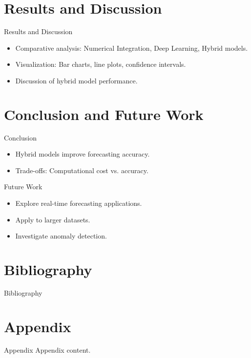 \documentclass[10pt]{beamer}
\begin{document}
\section{Results and Discussion}
\begin{frame}{Results and Discussion}
    \begin{itemize}
        \item Comparative analysis: Numerical Integration, Deep Learning, Hybrid models.
        \item Visualization: Bar charts, line plots, confidence intervals.
        \item Discussion of hybrid model performance.
    \end{itemize}
\end{frame}

\section{Conclusion and Future Work}
\begin{frame}{Conclusion}
    \begin{itemize}
        \item Hybrid models improve forecasting accuracy.
        \item Trade-offs: Computational cost vs. accuracy.
    \end{itemize}
\end{frame}

\begin{frame}{Future Work}
    \begin{itemize}
        \item Explore real-time forecasting applications.
        \item Apply to larger datasets.
        \item Investigate anomaly detection.
    \end{itemize}
\end{frame}
\section{Bibliography}
\begin{frame}{Bibliography}
    
\end{frame}

\section{Appendix}
\begin{frame}{Appendix}
    Appendix content.
\end{frame}
\end{document}
